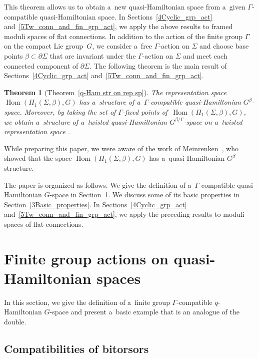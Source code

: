 \documentclass[pdftex]{sigma}
\numberwithin{equation}{section}
\newtheorem{Theorem}{Theorem}[section]
\theoremstyle{definition}
\newcommand{\Hom}{\operatorname{Hom}}
\newcommand{\mon}{\operatorname{mon}}
\begin{document}
This theorem allows us to obtain a~new quasi-Hamiltonian space from a~given $\Gamma$-compatible quasi-Hamiltonian space.
In Sections~\ref{4Cyclic_grp_act} and~\ref{5Tw_conn_and_fin_grp_act}, we apply the above results to framed moduli spaces of flat connections.
In addition to the action of the finite group $\Gamma$ on the compact Lie group~$G$, we consider a~free $\Gamma$-action on $\Sigma$ and choose base points $\beta \subset \partial \Sigma$ that are invariant under the $\Gamma$-action on $\Sigma$ and meet each connected component of $\partial \Sigma$.
The following theorem is the main result of Sections~\ref{4Cyclic_grp_act} and~\ref{5Tw_conn_and_fin_grp_act}.

\begin{Theorem}[Theorem~\ref{q-Ham str on rep sp}]
 The representation space $\Hom(\Pi_1(\Sigma,\beta),G)$ has a~structure of a~$\Gamma$-compatible quasi-Hamiltonian $G^{\beta}$-space.
 Moreover, by taking the set of $\Gamma$-fixed points of~$\Hom(\Pi_1(\Sigma,\beta),G)$, we obtain a~structure of a~twisted quasi-Hamiltonian $G^{\beta/\Gamma}$-space on a~twist\-ed representation space \smash{$\Hom_{\mon_{\Sigma/\Gamma, I}}(\Pi_1(\Sigma/\Gamma,\beta/\Gamma),G)$}.
\end{Theorem}

While preparing this paper, we were aware of the work of Meinrenken~\cite{Meinrenken2025}, who showed that the space $\Hom(\Pi_1(\Sigma,\beta),G)$ has a~quasi-Hamiltonian $G^{\beta}$-structure.

The paper is organized as follows.
We give the definition of a~$\Gamma$-compatible quasi-Hamiltonian $G$-space in Section~\ref{2Fin_grp_act_q-Ham_sp}.
We discuss some of its basic properties in Section~\ref{3Basic_properties}.
In Sections~\ref{4Cyclic_grp_act} and~\ref{5Tw_conn_and_fin_grp_act}, we apply the preceding results to moduli spaces of flat connections.

\section{Finite group actions on quasi-Hamiltonian spaces}\label{2Fin_grp_act_q-Ham_sp}
In this section, we give the definition of a~finite group $\Gamma$-compatible $q$-Hamiltonian $G$-space and present a~basic example that is an analogue of the double.

\subsection{Compatibilities of bitorsors}
\end{document}
